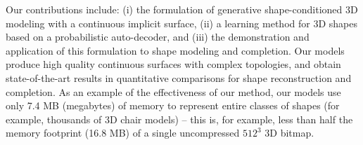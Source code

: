\documentclass[10pt,twocolumn,letterpaper]{article}
\newcommand\jj[1]{\textcolor{blue}{\textbf{#1}}}
\newcommand\pf[1]{\textcolor{red}{\textbf{#1}}}
\begin{document}
Our contributions include: (i) the formulation of generative shape-conditioned 3D modeling with a continuous implicit surface, (ii) a learning method for 3D shapes based on a probabilistic auto-decoder, and (iii) the demonstration and application of this formulation
to shape modeling and completion.  
Our models produce high quality continuous surfaces with complex topologies, and obtain state-of-the-art results in quantitative comparisons for shape reconstruction and completion.  As an example of the effectiveness of our method, our models use only 7.4 MB (megabytes) of memory to represent entire classes of shapes (for example, thousands of 3D chair models) -- this is, for example, less than half the memory footprint (16.8 MB) of a single uncompressed $512^3$ 3D bitmap.

\end{document}
